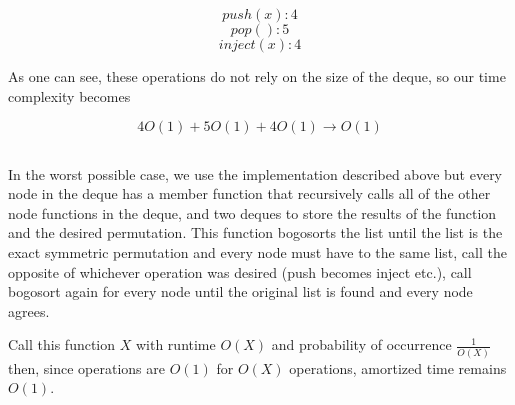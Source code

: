 \documentclass[journal]{IEEEtran}
\begin{document}
$$push(x): 4$$
$$pop(): 5$$
$$inject(x): 4$$

As one can see, these operations do not rely on the size of the deque, so our time complexity becomes

$$4O(1) + 5O(1) + 4O(1) \rightarrow \boxed{O(1)}$$

\subsection{}
In the worst possible case, we use the implementation described above but every node in the deque has a 
member function that recursively calls all of the other node functions in the deque, and two deques to store 
the results of the function and the desired permutation. This function bogosorts the list until the list is the exact symmetric 
permutation and every node must have to the same list, call the opposite of whichever operation was desired 
(push becomes inject etc.), call bogosort again for every node until the original list is found and every node agrees. 

Call this function $X$ with runtime $O(X)$ and probability of occurrence $\frac{1}{O(X)}$ then, since operations are $O(1)$
for $O(X)$ operations, amortized time remains $O(1)$.
\end{document}
